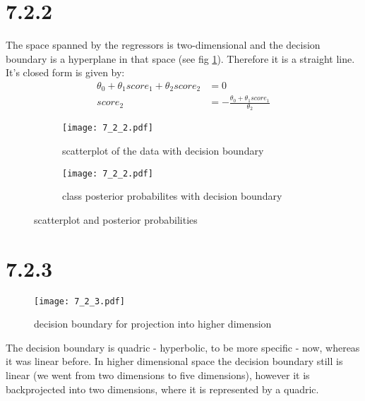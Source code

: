 \documentclass[a4paper,11pt]{article}
\theoremstyle{definition}
\theoremstyle{plain}
\theoremstyle{remark}
\begin{document}
\section*{7.2.2}
The space spanned by the regressors is two-dimensional and the decision boundary is a hyperplane in that space (see fig \ref{fig:lowdim}). Therefore it is a straight line. It's closed form is given by:
\begin{align}
\theta_0+\theta_1score_1+\theta_2score_2 &= 0 \\
score_2 &= -\frac{\theta_0+\theta_1score_1}{\theta_2}
\end{align}

\begin{figure}[H]
\centering
\begin{subfigure}{0.45\textwidth}
\texttt{[image: 7\_2\_2.pdf]}
\caption{scatterplot of the data with decision boundary}
\end{subfigure}
\hfill
\begin{subfigure}{0.45\textwidth}
\texttt{[image: 7\_2\_2.pdf]}
\caption{class posterior probabilites with decision boundary}
\end{subfigure}
\caption{scatterplot and posterior probabilities}
\label{fig:lowdim}
\end{figure}

\section*{7.2.3}
\begin{figure}[H]
\centering
\texttt{[image: 7\_2\_3.pdf]}
\caption{decision boundary for projection into higher dimension}
\label{fig:highdim}
\end{figure}

The decision boundary is quadric - hyperbolic, to be more specific - now, whereas it was linear before. In higher dimensional space the decision boundary still is linear (we went from two dimensions to five dimensions), however it is backprojected into two dimensions, where it is represented by a quadric.
\end{document}
